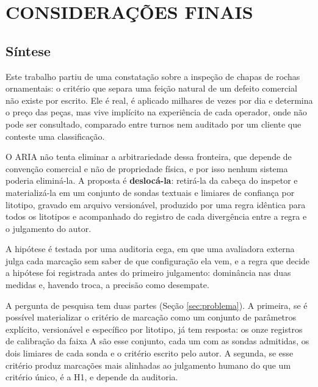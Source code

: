 \chapter[CONSIDERAÇÕES FINAIS]{CONSIDERAÇÕES FINAIS}

\section{Síntese}

Este trabalho partiu de uma constatação sobre a inspeção de chapas de rochas ornamentais: o critério que separa uma feição natural de um defeito comercial não existe por escrito. Ele é real, é aplicado milhares de vezes por dia e determina o preço das peças, mas vive implícito na experiência de cada operador, onde não pode ser consultado, comparado entre turnos nem auditado por um cliente que conteste uma classificação.

O ARIA não tenta eliminar a arbitrariedade dessa fronteira, que depende de convenção comercial e não de propriedade física, e por isso nenhum sistema poderia eliminá-la. A proposta é \textbf{deslocá-la}: retirá-la da cabeça do inspetor e materializá-la em um conjunto de sondas textuais e limiares de confiança por litotipo, gravado em arquivo versionável, produzido por uma regra idêntica para todos os litotipos e acompanhado do registro de cada divergência entre a regra e o julgamento do autor.

A hipótese é testada por uma auditoria cega, em que uma avaliadora externa julga cada marcação sem saber de que configuração ela vem, e a regra que decide a hipótese foi registrada antes do primeiro julgamento: dominância nas duas medidas e, havendo troca, a precisão como desempate.


A pergunta de pesquisa tem duas partes (Seção \ref{sec:problema}). A primeira, se é possível materializar o critério de marcação como um conjunto de parâmetros explícito, versionável e específico por litotipo, já tem resposta: os onze registros de calibração da faixa A são esse conjunto, cada um com as sondas admitidas, os dois limiares de cada sonda e o critério escrito pelo autor. A segunda, se esse critério produz marcações mais alinhadas ao julgamento humano do que um critério único, é a H1, e depende da auditoria.

